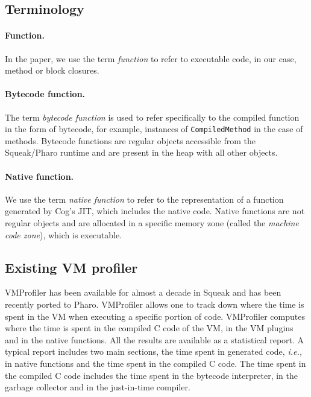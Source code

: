 \documentclass[10pt,preprint,nonatbib]{sigplanconf}
\newcommand{\ct}{\lstinline[backgroundcolor=\color{white},basicstyle=\small\ttfamily]}
\newcommand{\ie}{\emph{i.e.,}\xspace}
\begin{document}
\subsection{Terminology}

\paragraph{Function.} In the paper, we use the term \emph{function} to refer to executable code, in our case, method or block closures.

\paragraph{Bytecode function.} The term \emph{bytecode function} is used to refer specifically to the compiled function in the form of bytecode, for example, instances of \ct{CompiledMethod} in the case of methods. Bytecode functions are regular objects accessible from the Squeak/Pharo runtime and are present in the heap with all other objects.

\paragraph{Native function.} We use the term \emph{native function} to refer to the representation of a function generated by Cog's JIT, which includes the native code. Native functions are not regular objects and are allocated in a specific memory zone (called the \emph{machine code zone}), which is executable.

\subsection{Existing VM profiler}

VMProfiler has been available for almost a decade in Squeak and has been recently ported to Pharo. VMProfiler allows one to track down where the time is spent in the VM when executing a specific portion of code. VMProfiler computes where the time is spent in the compiled C code of the VM, in the VM plugins and in the native functions. All the results are available as a statistical report. A typical report includes two main sections, the time spent in generated code, \ie in native functions and the time spent in the compiled C code. The time spent in the compiled C code includes the time spent in the bytecode interpreter, in the garbage collector and in the just-in-time compiler. 
 
\end{document}
